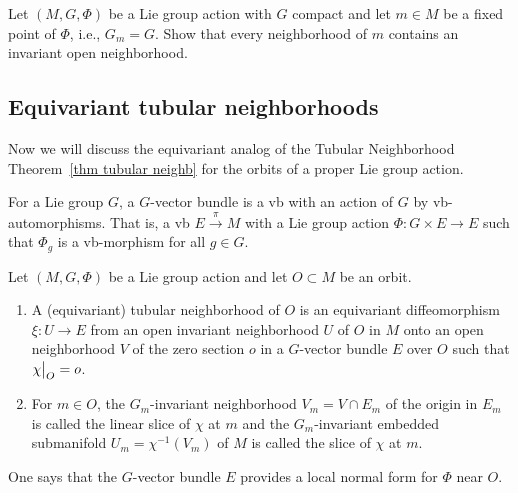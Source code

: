 \begin{xca}\label{xca 6.3.2 RS1}
    Let $(M,G,\Phi)$ be a Lie group action with $G$ compact and let $m\in M$ be a fixed point of $\Phi$, i.e., $G_m=G$. Show that every neighborhood of $m$ contains an invariant open neighborhood.
\end{xca}






\subsection{Equivariant tubular neighborhoods}

Now we will discuss the equivariant analog of the Tubular Neighborhood Theorem~\ref{thm tubular neighb} for the orbits of a proper Lie group action.

\begin{defn}
    For a Lie group $G$, a $G$-vector bundle is a \gls{vb} with an action of $G$ by \gls{vb}-automorphisms. That is, a \gls{vb} $E\overset{\pi}{\to}M$ with a Lie group action $\Phi:G\times E\to E$ such that $\Phi_g$ is a \gls{vb}-morphism for all $g\in G$.
\end{defn}

\begin{defn}
    Let $(M,G,\Phi)$ be a Lie group action and let $O\subset M$ be an orbit.
    \begin{enumerate}
        \item A (equivariant) tubular neighborhood of $O$ is an equivariant diffeomorphism $\xi:U\to E$  from an open invariant neighborhood $U$ of $O$ in $M$ onto an open neighborhood $V$ of the zero section $o$ in a $G$-vector bundle $E$ over $O$ such that $\restr{\chi}{O}=o$.
        \item For $m\in O$, the $G_m$-invariant neighborhood $V_m=V\cap E_m$ of the origin in $E_m$ is called the linear slice of $\chi$ at $m$ and the $G_m$-invariant embedded submanifold $U_m=\chi^{-1}(V_m)$ of $M$ is called the slice of $\chi$ at $m$.
    \end{enumerate}
    One says that the $G$-vector bundle $E$ provides a local normal form for $\Phi$ near $O$.
\end{defn}

